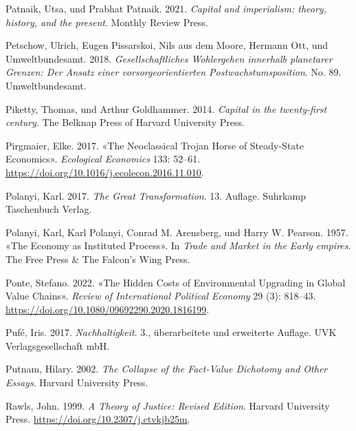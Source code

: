 \documentclass[
  nswissgerman,
  a4paper,
  DIV=11,
  numbers=noendperiod,
  oneside,
  openany]{scrreprt}
\newlength{\cslhangindent}
\newenvironment{CSLReferences}[2] %
 {\begin{list}{}{%
  \setlength{\itemindent}{0pt}
  \setlength{\leftmargin}{0pt}
  \setlength{\parsep}{0pt}
  \ifodd #1
   \setlength{\leftmargin}{\cslhangindent}
   \setlength{\itemindent}{-1\cslhangindent}
  \fi
  \setlength{\itemsep}{#2\baselineskip}}}
 {\end{list}}
\begin{document}
\begin{CSLReferences}{1}{1}
Patnaik, Utsa, und Prabhat Patnaik. 2021. \emph{Capital and imperialism:
theory, history, and the present}. Monthly Review Press.

Petschow, Ulrich, Eugen Pissarskoi, Nils aus dem Moore, Hermann Ott, und
Umweltbundesamt. 2018. \emph{Gesellschaftliches Wohlergehen innerhalb
planetarer Grenzen: Der Ansatz einer vorsorgeorientierten
Postwachstumsposition}. No. 89. Umweltbundesamt.

Piketty, Thomas, und Arthur Goldhammer. 2014. \emph{Capital in the
twenty-first century}. The Belknap Press of Harvard University Press.

Pirgmaier, Elke. 2017. {«The Neoclassical Trojan Horse of Steady-State
Economics»}. \emph{Ecological Economics} 133: 52--61.
\url{https://doi.org/10.1016/j.ecolecon.2016.11.010}.

Polanyi, Karl. 2017. \emph{The Great Transformation}. 13. Auflage.
Suhrkamp Taschenbuch Verlag.

Polanyi, Karl, Karl Polanyi, Conrad M. Arensberg, und Harry W. Pearson.
1957. {«The Economy as Instituted Process»}. In \emph{Trade and Market
in the Early empires}. The Free Press \& The Falcon's Wing Press.

Ponte, Stefano. 2022. {«The Hidden Costs of Environmental Upgrading in
Global Value Chains»}. \emph{Review of International Political Economy}
29 (3): 818--43. \url{https://doi.org/10.1080/09692290.2020.1816199}.

Pufé, Iris. 2017. \emph{Nachhaltigkeit}. 3., überarbeitete und
erweiterte Auflage. UVK Verlagsgesellschaft mbH.

Putnam, Hilary. 2002. \emph{The Collapse of the Fact-Value Dichotomy and
Other Essays}. Harvard University Press.

Rawls, John. 1999. \emph{A {Theory} of {Justice}: {Revised} {Edition}}.
Harvard University Press. \url{https://doi.org/10.2307/j.ctvkjb25m}.


\end{CSLReferences}
\end{document}

